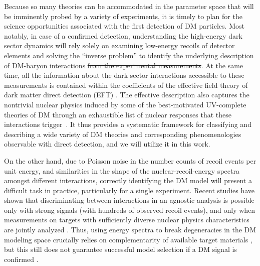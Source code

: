 \documentclass[11pt]{article}
\newcommand{\sjwColor}{red}
\newcommand{\sjwrm}[1]{{\color{\sjwColor}\protect\sout{#1}}}
\begin{document}
Because so many theories can be accommodated in the parameter space that will be imminently probed by a variety of experiments, it is timely to plan for the science opportunities associated with the first detection of DM particles. Most notably, in case of a confirmed detection, understanding the high-energy dark sector dynamics will rely solely on examining low-energy recoils of detector elements and solving the ``inverse problem'' to identify the underlying description of DM-baryon interactions \sjwrm{from the experimental measurements}. At the same time, all the information about the dark sector interactions accessible to these measurements is contained within the coefficients of the effective field theory of dark matter direct detection (EFT) \cite{Fitzpatrick:2012ix,Fitzpatrick:2012ib,Anand:2013yka,Bishara:2016hek}. The effective description also captures the nontrivial nuclear physics induced by some of the best-motivated UV-complete theories of DM \cite{Gresham:2014vja, Gluscevic:2015sqa,DEramo:2014nmf} through an exhaustible list of nuclear responses that these interactions trigger~\cite{Fitzpatrick:2012ix,Fitzpatrick:2012ib,Anand:2013yka}. It thus provides a systematic framework for classifying and describing a wide variety of DM theories and corresponding phenomenologies observable with direct detection, and we will utilize it in this work. 
 
On the other hand, due to Poisson noise in the number counts of recoil events per unit energy, and similarities in the shape of the nuclear-recoil-energy spectra amongst different interactions, correctly identifying the DM model will present a difficult task in practice, particularly for a single experiment. Recent studies have shown that discriminating between interactions in an agnostic analysis is possible only with strong signals (with hundreds of observed recoil events), and only when measurements on targets with sufficiently diverse nuclear physics characteristics are jointly analyzed \cite{Gluscevic:2014vga,Gluscevic:2015sqa}. Thus, using energy spectra to break degeneracies in the DM modeling space crucially relies on complementarity of available target materials \cite{McDermott:2011hx,Peter:2013aha,Gluscevic:2014vga,Catena:2014epa,Catena:2014hla,Dent:2015zpa,Gluscevic:2015sqa,Ruppin:2014bra}, but this still does not guarantee successful model selection if a DM signal is confirmed \cite{Gluscevic:2014vga,Gluscevic:2015sqa}.
\end{document}
